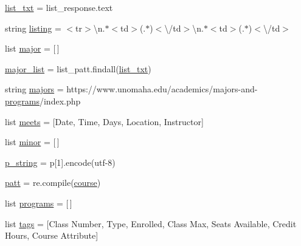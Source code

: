 \begin{DoxyCompactItemize}
\item 
\mbox{\hyperlink{namespacetest_a8a1b8f17c829fb2fd08d4a41ad9cf087}{list\+\_\+txt}} = list\+\_\+response.\+text
\item 
string \mbox{\hyperlink{namespacetest_aa935a14b351dde1a77f8a9fdf62ab9e4}{listing}} = \textquotesingle{}$<$tr$>$\textbackslash{}n.$\ast$$<$td$>$(.$\ast$)$<$\textbackslash{}/td$>$\textbackslash{}n.$\ast$$<$td$>$(.$\ast$)$<$\textbackslash{}/td$>$\textquotesingle{}
\item 
list \mbox{\hyperlink{namespacetest_ada45734818465c5ed866e7491e46ee3d}{major}} = \mbox{[}$\,$\mbox{]}
\item 
\mbox{\hyperlink{namespacetest_a65c8db757e1e3c99b5f55ed6dcf17181}{major\+\_\+list}} = list\+\_\+patt.\+findall(\mbox{\hyperlink{namespacetest_a8a1b8f17c829fb2fd08d4a41ad9cf087}{list\+\_\+txt}})
\item 
string \mbox{\hyperlink{namespacetest_aac866171a3a2f476bc4ee9c246332d20}{majors}} = \textquotesingle{}https\+://www.\+unomaha.\+edu/academics/majors-\/and-\/\mbox{\hyperlink{namespacetest_a41110e26af9a29431f856ff8e6e63389}{programs}}/index.\+php\textquotesingle{}
\item 
list \mbox{\hyperlink{namespacetest_a091ffed22add46378587d16bdaa4ce6c}{meets}} = \mbox{[}\textquotesingle{}Date\textquotesingle{}, \textquotesingle{}Time\textquotesingle{}, \textquotesingle{}Days\textquotesingle{}, \textquotesingle{}Location\textquotesingle{}, \textquotesingle{}Instructor\textquotesingle{}\mbox{]}
\item 
list \mbox{\hyperlink{namespacetest_a6facd83236fb50c287bb03f98341bc17}{minor}} = \mbox{[}$\,$\mbox{]}
\item 
\mbox{\hyperlink{namespacetest_a5c2a72e8bf34cbecb251dfb910bfecc6}{p\+\_\+string}} = p\mbox{[}1\mbox{]}.encode(\textquotesingle{}utf-\/8\textquotesingle{})
\item 
\mbox{\hyperlink{namespacetest_aaaf53edd3eaffb34d42528d483908a81}{patt}} = re.\+compile(\mbox{\hyperlink{namespacetest_aef2c5d7bd8ec9fc2ba0447263d36cbc5}{course}})
\item 
list \mbox{\hyperlink{namespacetest_a41110e26af9a29431f856ff8e6e63389}{programs}} = \mbox{[}$\,$\mbox{]}
\item 
list \mbox{\hyperlink{namespacetest_a2a46bc1425db9915e0922da341e3011c}{tags}} = \mbox{[}\textquotesingle{}Class Number\textquotesingle{}, \textquotesingle{}Type\textquotesingle{}, \textquotesingle{}Enrolled\textquotesingle{}, \textquotesingle{}Class Max\textquotesingle{}, \textquotesingle{}Seats Available\textquotesingle{}, \textquotesingle{}Credit Hours\textquotesingle{}, \textquotesingle{}Course Attribute\textquotesingle{}\mbox{]}
\end{DoxyCompactItemize}


